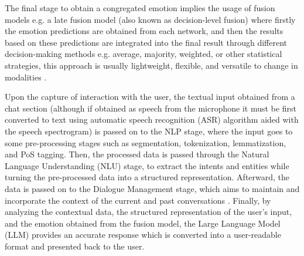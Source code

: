 \documentclass[runningheads]{llncs}
\begin{document}
The final stage to obtain a congregated emotion implies the usage of fusion models e.g. a late fusion model (also known as decision-level fusion) where firstly the emotion predictions are obtained from each network, and then the results based on these predictions are integrated into the final result through different decision-making methods e.g. average, majority, weighted, or other statistical strategies, this approach is usually lightweight, flexible, and versatile to change in modalities \cite{zhu_multimodal_2023}.

Upon the capture of interaction with the user, the textual input obtained from a chat section (although if obtained as speech from the microphone it must be first converted to text using automatic speech recognition (ASR) algorithm aided with the speech spectrogram) is passed on to the NLP stage, where the input goes to some pre-processing stages such as segmentation, tokenization, lemmatization, and PoS tagging. Then, the processed data is passed through the Natural Language Understanding (NLU) stage, to extract the intents and entities while turning the pre-processed data into a structured representation. Afterward, the data is passed on to the Dialogue Management stage, which aims to maintain and incorporate the context of the current and past conversations \cite{rizou_multilingual_2022}. Finally, by analyzing the contextual data, the structured representation of the user's input, and the emotion obtained from the fusion model, the Large Language Model (LLM) provides an accurate response which is converted into a user-readable format and presented back to the user.




\end{document}
